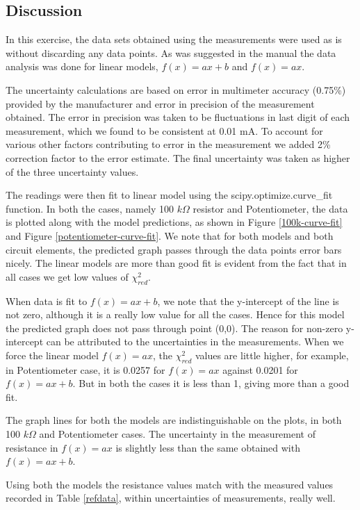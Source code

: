 \documentclass[letterpaper,12pt]{article}
\begin{document}
\subsection{Discussion}

In this exercise, the data sets obtained using the measurements were used as is without discarding any data points. As was 
suggested in the manual the data analysis was done for linear models, $f(x) = ax +b$ and $f(x) =  ax$.

The uncertainty calculations are based on error in multimeter accuracy (0.75\%) provided by the manufacturer and error in precision of
the measurement obtained. The error in precision was taken to be fluctuations in last digit of each measurement,  which
we found to be consistent at 0.01 mA. To account for various other factors contributing to error in the measurement
we added 2\% correction factor to the error estimate. The final uncertainty was taken as higher of the three uncertainty
values.

The readings were then fit to linear model using the scipy.optimize.curve\_fit function. In both the cases, namely 100 $k\Omega$
resistor and Potentiometer, the data is plotted along with the model predictions, as shown in Figure \ref{100k-curve-fit} and 
Figure \ref{potentiometer-curve-fit}. We note that for both models and both circuit elements, the predicted graph
passes through the data points error bars nicely. The linear models are more than good fit is evident 
from the fact that in all cases we get low values of $\chi^2_{red}$.

When data is fit to $f(x) = ax + b$, we note that the y-intercept of the line is not zero, although it is a really low value for all the cases. Hence 
for this model the predicted graph does not pass through point (0,0). The reason for non-zero y-intercept can be attributed to
the uncertainties in the measurements. When we force the linear model $f(x) = ax$, the $\chi_{red}^2$ values are little higher, for example,
in Potentiometer case, it is 0.0257 for $f(x) = ax$ against 0.0201 for $f(x) = ax + b$. But in both the cases it is less than 1, giving more than
a good fit. 

The graph lines for both the models are indistinguishable on the plots, in both 100 $k\Omega$ and 
Potentiometer cases. The uncertainty in the measurement of resistance in $f(x) = ax$ is slightly less than the same obtained with $f(x) = ax + b$.

Using both the models the resistance values match with the measured values recorded in Table \ref{refdata}, within
uncertainties of measurements, really well.
\end{document}
